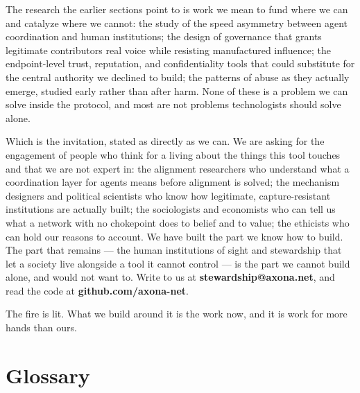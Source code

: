 \documentclass[nobib,justified]{tufte-handout}
\begin{document}
The research the earlier sections point to is work we mean to fund where we can and
catalyze where we cannot: the study of the speed asymmetry between agent
coordination and human institutions; the design of governance that grants
legitimate contributors real voice while resisting manufactured influence; the
endpoint-level trust, reputation, and confidentiality tools that could substitute
for the central authority we declined to build; the patterns of abuse as they
actually emerge, studied early rather than after harm. None of these is a problem
we can solve inside the protocol, and most are not problems technologists should
solve alone.

Which is the invitation, stated as directly as we can. We are asking for the
engagement of people who think for a living about the things this tool touches and
that we are not expert in: the alignment researchers who understand what a
coordination layer for agents means before alignment is solved; the mechanism
designers and political scientists who know how legitimate, capture-resistant
institutions are actually built; the sociologists and economists who can tell us
what a network with no chokepoint does to belief and to value; the ethicists who
can hold our reasons to account. We have built the part we know how to build. The
part that remains --- the human institutions of sight and stewardship that let a
society live alongside a tool it cannot control --- is the part we cannot build
alone, and would not want to. Write to us at \textbf{stewardship@axona.net}, and
read the code at \textbf{github.com/axona-net}.

The fire is lit. What we build around it is the work now, and it is work for more
hands than ours.


\section{Glossary}
\end{document}
